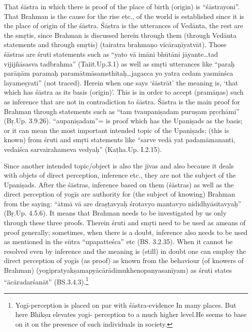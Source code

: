 That śāstra in which there is proof of the place of birth (origin) is “śāstrayoni”. That Brahman is the cause for the rise etc., of the world is established since it is the place of origin of the śāstra. Śāstra is the utterances of Vedānta, the rest are the smṛtis, since Brahman is discussed herein through them (through Vedānta statements and through smṛtis) (tairatra brahmaṇo vicāraṇīyatvāt). Those śāstras are śruti statements such as “yato vā imāni bhūtāni jāyante…tad vijijñāsasva tadbrahma” (Taiit.Up.3.1) as well as smṛti utterances like “paraḥ parāṇām paramaḥ paramātmāsamsthitaḥ…jagacca yo yatra cedam yasminśca layameṣyati” (not traced). Herein when one says ‘śāstrāt’ the meaning is, ‘that which has śāstra as its basis (origin)’. This is in order to accept (pramāṇas) such as inference that are not in contradiction to śāstra. Śāstra is the main proof for Brahman through statements such as “tam tvaupaniṣadam puruṣam pṛcchāmi” (Bṛ.Up. 3.9.26). “aupaniṣadam”= is proof which has the Upaniṣads as the basis; or it can mean the most important intended topic of the Upaniṣads; (this is known) from śruti and smṛti statements like “sarve vedā yat padamāmananti, vedaiśca sarvairahameva vedyaḥ” (Kaṭha.Up. I.2.15).

Since another intended topic/object is also the jīvas and also because it deals with objets of direct perception, inference etc., they are not the subject  of the Upaniṣads. After the śāstras, inference based on them (śāstras) as well as the direct perception of yogīs are authority for (the subject of knowing) Brahman from the saying: “ātmā vā are draṣṭavyaḥ śrotavyo mantavyo nididhyāsitavyaḥ” (Bṛ.Up. 4.5.6). It means that Brahman needs to be investigated by us only through these three proofs. Therein śruti and smṛti need to be used as ameans of proof generally; sometimes, when there is a doubt, inference also needs to be used as mentioned in the sūtra “upapatteśca” etc (BS. 3.2.35). When it cannot be resolved even by inference and the meaning is (still) in doubt one can employ the direct perception of yogīs (as proof) as known from the behaviour (of knowers of Brahman) (yogipratyakṣamapyācārādimukhenopanyasanīyam) as śruti states “ācāradarśanāt” (BS.3.4.3).\footnote{Yogī-perception is placed on par with śāstra-evidence In many places. But here Bhikṣu elevates yogi-
perception to a much higher level.He seems to base on it on the presence of such individuals in society.} 



